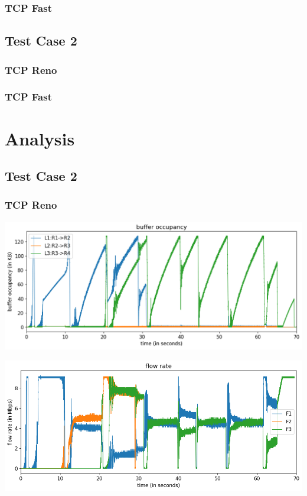 \documentclass{article}
\begin{document}
\subsubsection{TCP Fast}

\subsection{Test Case 2}

\subsubsection{TCP Reno}

\subsubsection{TCP Fast}

\section{Analysis}


\subsection{Test Case 2}

\subsubsection{TCP Reno}

\includegraphics[width = \textwidth]{"test_case2_reno buffer occupancy"}

\includegraphics[width = \textwidth]{"test_case2_reno flow rate"}
\end{document}
